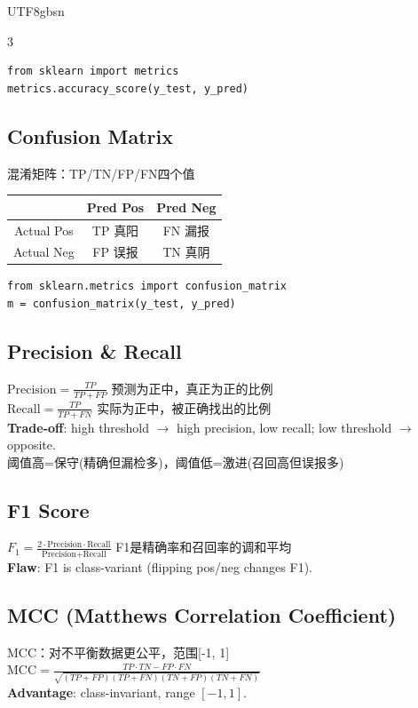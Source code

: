 \documentclass[9pt,landscape,a4paper]{article}
\newcommand{\zhint}[1]{{\scriptsize\color{gray!70!black}#1}}
\begin{document}
\begin{CJK}{UTF8}{gbsn}
\begin{multicols}{3}
\begin{lstlisting}
from sklearn import metrics
metrics.accuracy_score(y_test, y_pred)
\end{lstlisting}

\subsection{Confusion Matrix}
\zhint{混淆矩阵：TP/TN/FP/FN四个值}
\begin{center}
\scriptsize
\begin{tabular}{c|c|c}
 & Pred Pos & Pred Neg \\ \hline
Actual Pos & TP \zhint{真阳} & FN \zhint{漏报} \\ \hline
Actual Neg & FP \zhint{误报} & TN \zhint{真阴} \\
\end{tabular}
\end{center}

\begin{lstlisting}
from sklearn.metrics import confusion_matrix
m = confusion_matrix(y_test, y_pred)
\end{lstlisting}

\subsection{Precision \& Recall}
$\text{Precision} = \frac{TP}{TP + FP}$ \zhint{预测为正中，真正为正的比例}\\[2pt]
$\text{Recall} = \frac{TP}{TP + FN}$ \zhint{实际为正中，被正确找出的比例}\\[2pt]
\textbf{Trade-off}: high threshold $\to$ high precision, low recall; low threshold $\to$ opposite.\\
\zhint{阈值高=保守(精确但漏检多)，阈值低=激进(召回高但误报多)}

\subsection{F1 Score}
$F_1 = \frac{2 \cdot \text{Precision} \cdot \text{Recall}}{\text{Precision} + \text{Recall}}$
\zhint{F1是精确率和召回率的调和平均}\\
\textbf{Flaw}: F1 is class-variant (flipping pos/neg changes F1).

\subsection{MCC (Matthews Correlation Coefficient)}
\zhint{MCC：对不平衡数据更公平，范围[-1, 1]}\\
$\text{MCC} = \frac{TP \cdot TN - FP \cdot FN}{\sqrt{(TP+FP)(TP+FN)(TN+FP)(TN+FN)}}$\\
\textbf{Advantage}: class-invariant, range $[-1, 1]$.


\end{multicols}
\end{CJK}
\end{document}
